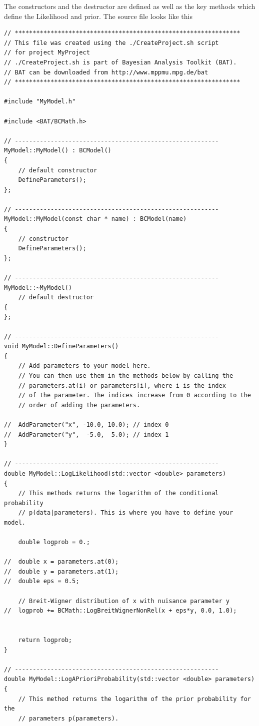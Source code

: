 \documentclass[11pt, a4paper]{article}
\begin{document}
\noindent
The constructors and the destructor are defined as well as the key
methods which define the Likelihood and prior. The source file looks
like this

\begin{verbatim}
// ***************************************************************
// This file was created using the ./CreateProject.sh script
// for project MyProject
// ./CreateProject.sh is part of Bayesian Analysis Toolkit (BAT).
// BAT can be downloaded from http://www.mppmu.mpg.de/bat
// ***************************************************************

#include "MyModel.h"

#include <BAT/BCMath.h>

// ---------------------------------------------------------
MyModel::MyModel() : BCModel()
{  
	// default constructor
	DefineParameters();
};

// ---------------------------------------------------------
MyModel::MyModel(const char * name) : BCModel(name)
{ 
	// constructor
	DefineParameters();
};

// ---------------------------------------------------------
MyModel::~MyModel()
	// default destructor
{
};

// ---------------------------------------------------------
void MyModel::DefineParameters()
{
	// Add parameters to your model here.
	// You can then use them in the methods below by calling the
	// parameters.at(i) or parameters[i], where i is the index
	// of the parameter. The indices increase from 0 according to the
	// order of adding the parameters.

//	AddParameter("x", -10.0, 10.0); // index 0
//	AddParameter("y",  -5.0,  5.0); // index 1
}

// ---------------------------------------------------------
double MyModel::LogLikelihood(std::vector <double> parameters)
{
	// This methods returns the logarithm of the conditional probability
	// p(data|parameters). This is where you have to define your model.

	double logprob = 0.;

//	double x = parameters.at(0);
//	double y = parameters.at(1);
//	double eps = 0.5;

	// Breit-Wigner distribution of x with nuisance parameter y
//	logprob += BCMath::LogBreitWignerNonRel(x + eps*y, 0.0, 1.0);


	return logprob;
}

// ---------------------------------------------------------
double MyModel::LogAPrioriProbability(std::vector <double> parameters)
{
	// This method returns the logarithm of the prior probability for the
	// parameters p(parameters).


\end{verbatim}
\end{document}
